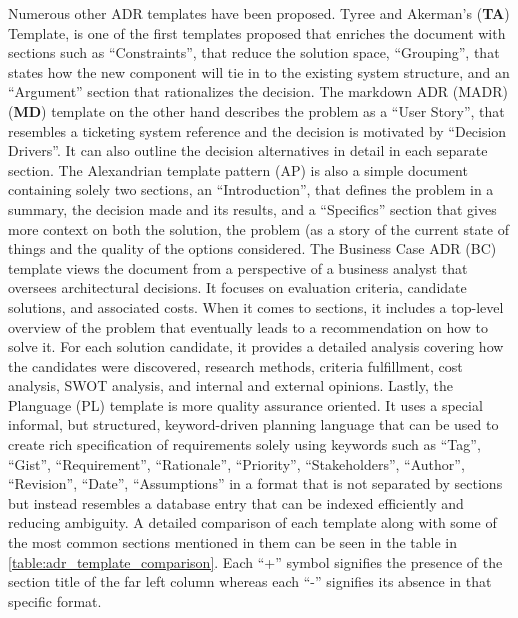         Numerous other ADR templates have been proposed. Tyree and Akerman's (\textbf{TA}) Template, is one of the first templates proposed that enriches the document with sections such as ``Constraints'', that reduce the solution space, ``Grouping'', that states how the new component will tie in to the existing system structure, and an ``Argument'' section that rationalizes the decision. The markdown ADR (MADR) (\textbf{MD}) template\cite{MarkdownADRs} on the other hand describes the problem as a ``User Story'', that resembles a ticketing system reference and the decision is motivated by ``Decision Drivers''. It can also outline the decision alternatives in detail in each separate section. The Alexandrian template pattern (AP) is also a simple document containing solely two sections, an ``Introduction'', that defines the problem in a summary, the decision made and its results, and a ``Specifics'' section that gives more context on both the solution, the problem (as a story of the current state of things and the quality of the options considered. The Business Case ADR (BC) template views the document from a perspective of a business analyst that oversees architectural decisions. It focuses on evaluation criteria, candidate solutions, and associated costs. When it comes to sections, it includes a top-level overview of the problem that eventually leads to a recommendation on how to solve it. For each solution candidate, it provides a detailed analysis covering how the candidates were discovered, research methods, criteria fulfillment, cost analysis, SWOT analysis, and internal and external opinions. Lastly, the Planguage (PL) template is more quality assurance oriented. It uses a special informal, but structured, keyword-driven
        planning language that can be used to create rich specification of requirements solely using keywords such as ``Tag'', ``Gist'', ``Requirement'', ``Rationale'', ``Priority'', ``Stakeholders'',  ``Author'', ``Revision'', ``Date'', ``Assumptions'' in a format that is not separated by sections but instead resembles a database entry that can be indexed efficiently and reducing ambiguity. A detailed comparison of each template along with some of the most common sections mentioned in them can be seen in the table in \ref{table:adr_template_comparison}. Each ``+'' symbol signifies the presence of the section title of the far left column whereas each ``-'' signifies its absence in that specific format.  
    
        \newpage
        

